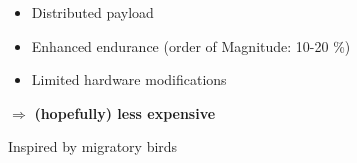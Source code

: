\documentclass[12pt,svgnames,table,draft=false]{beamer}
\begin{document}
\begin{frame}{}

\vspace{-8em}
\centering
\begin{tcolorbox}[width=.8\textwidth,colback=gray!10!,title=Fleets of UAS]  
\centering
\begin{itemize}
\item Distributed payload
\item Enhanced endurance (order of Magnitude: 10-20 \%)
\item Limited hardware modifications
\end{itemize}
\centering
$\Rightarrow$ \textbf{(hopefully) less expensive}
\end{tcolorbox}  

\end{frame}

\begin{frame}{Inspired by migratory birds}

\end{frame}
\end{document}
